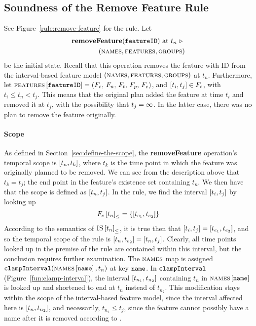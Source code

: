 \subsection{Soundness of the Remove Feature Rule}
\label{sub:soundness-of-the-remove-feature-rule}

See Figure~\vref{rule:remove-feature} for the  rule. 
Let 
\begin{equation*}
   \begin{split}
      \textbf{removeFeature}(\texttt{featureID})\text{ at } t_n
      \ \triangleright \  \\
   (\textsc{names}{}, \textsc{features}{}, \textsc{groups}{}{})
\end{split}
\end{equation*}
be the initial state. Recall that this operation removes the feature with ID  from the interval-based feature model $(\textsc{names}{}, \textsc{features}{}, \textsc{groups}{}{})$ at $t_n$. Furthermore, let $\textsc{features} \left[ \texttt{featureID} \right] = \left(F_e,\, F_n,\, F_t,\, F_p,\, F_c\right)$, and $\interval{t_i}{t_j} \in F_e$, with $t_i \leq t_n < t_j$. This means that the original plan added the feature at time $t_i$ and removed it at $t_j$, with the possibility that $t_j = \infty$. In the latter case, there was no plan to remove the feature originally.

\paragraph{Scope}
As defined in Section~\vref{sec:define-the-scope}, the \textbf{removeFeature} operation's temporal scope is $\interval{t_n}{t_k}$, where $t_k$ is the time point in which the feature was originally planned to be removed. We can see from the description above that $t_k = t_j$; the end point in the feature's existence set containing $t_n$. We then have that the scope is defined as $\interval{t_n}{t_j}$. In the rule, we find the interval $\interval{t_i}{t_j}$ by looking up
\begin{equation*}
   \containing{F_e}{t_n} = \set{\interval{t_{e_1}}{t_{e_2}}}
\end{equation*}
   According to the semantics of ${\textsc{IS} \left[ t_n \right]}_{\leq}$, it is true then that $\interval{t_i}{t_j} = \interval{t_{e_1}}{t_{e_2}}$, and so the temporal scope of the rule is $\interval{t_n}{t_{e_2}} = \interval{t_n}{t_j}$. Clearly, all time points looked up in the premise of the rule are contained within this interval, but the conclusion requires further examination. The $\textsc{names}{}$ map is assigned $\texttt{clampInterval}(\textsc{names} \left[ \texttt{name} \right], t_n)$ at key $\texttt{name}$. In $\texttt{clampInterval}$ (Figure~\vref{fun:clamp-interval}), the interval $\interval{t_{n_1}}{t_{n_2}}$ containing $t_n$ in $\textsc{names} \left[ \texttt{name} \right]$ is looked up and shortened to end at $t_n$ instead of $t_{n_2}$. This modification stays within the scope of the interval-based feature model, since the interval affected here is $\interval{t_n}{t_{n_2}}$, and necessarily, $t_{n_2} \leq t_j$, since the feature cannot possibly have a name after it is removed according to . 

